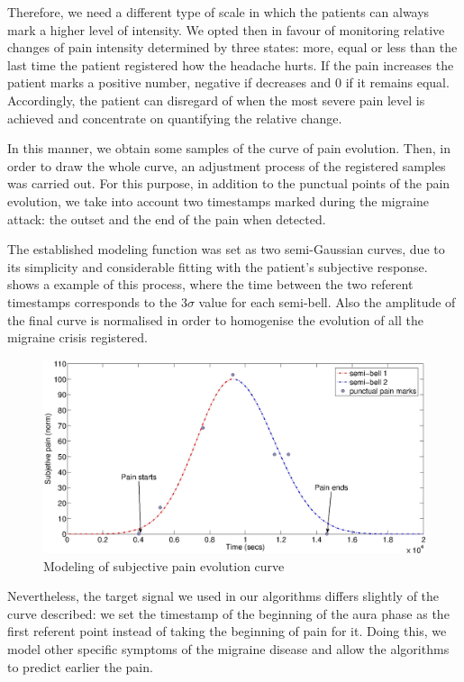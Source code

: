 Therefore, we need a different type of scale in which the patients can always mark a higher level of intensity. We opted then in favour of monitoring relative changes of pain intensity determined by three states: more, equal or less than the last time the patient registered how the headache hurts. 
If the pain increases the patient marks a positive number, negative if decreases and 0 if it remains equal. Accordingly, the patient can disregard of when the most severe pain level is achieved and concentrate on quantifying the relative change.

In this manner, we obtain some samples of the curve of pain evolution. 
Then, in order to draw the whole curve, an adjustment process of the registered samples was carried out. 
For this purpose, in addition to the punctual points of the pain evolution, we take into account two timestamps marked during the
migraine attack: the outset and the end of the pain when detected.

The established modeling function was set as two semi-Gaussian curves, due to its simplicity and considerable fitting with the
patient's subjective response.  shows a example of this process, where the time between the two referent timestamps corresponds to the $3\sigma$ value for each semi-bell.
Also the amplitude of the final curve is normalised in order to homogenise the evolution of all the migraine crisis registered. 

\begin{figure}[!ht]
\centering
\includegraphics[width=\textwidth]{images/paincurvereal}
\caption{Modeling of subjective pain evolution curve}
\label{fig:paincurve}
\end{figure}

Nevertheless, the target signal we used in our algorithms differs slightly of the curve described: we set the timestamp of the beginning of the aura phase as the first referent point instead of taking the beginning of pain for it. Doing this, we model other specific symptoms of the migraine disease and allow the algorithms to predict earlier the pain.

